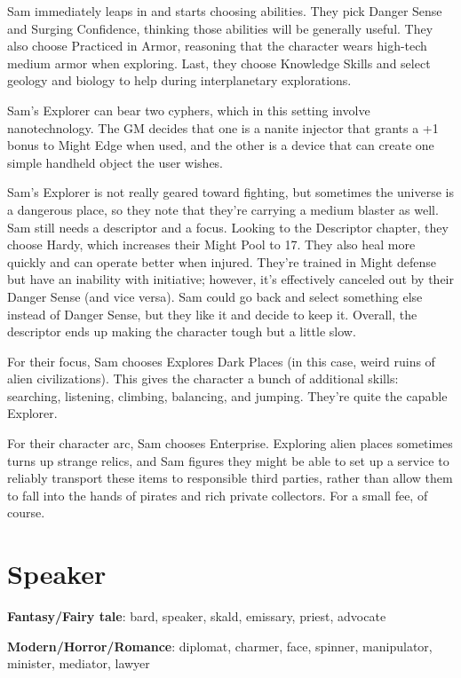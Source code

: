 \begin{multicols}{2}
Sam immediately leaps in and starts choosing abilities. They pick Danger Sense and Surging Confidence, thinking those abilities will be generally useful. They also choose Practiced in Armor, reasoning that the character wears high-tech medium armor when exploring. Last, they choose Knowledge Skills and select geology and biology to help during interplanetary explorations. 

Sam’s Explorer can bear two cyphers, which in this setting involve nanotechnology. The GM decides that one is a nanite injector that grants a +1 bonus to Might Edge when used, and the other is a device that can create one simple handheld object the user wishes. 

Sam’s Explorer is not really geared toward fighting, but sometimes the universe is a dangerous place, so they note that they’re carrying a medium blaster as well.
Sam still needs a descriptor and a focus. Looking to the Descriptor chapter, they choose Hardy, which increases their Might Pool to 17. They also heal more quickly and can operate better when injured. They’re trained in Might defense but have an inability with initiative; however, it’s effectively canceled out by their Danger Sense (and vice versa). Sam could go back and select something else instead of Danger Sense, but they like it and decide to keep it. Overall, the descriptor ends up making the character tough but a little slow.

For their focus, Sam chooses Explores Dark Places (in this case, weird ruins of alien civilizations). This gives the character a bunch of additional skills: searching, listening, climbing, balancing, and jumping. They’re quite the capable Explorer.

For their character arc, Sam chooses Enterprise. Exploring alien places sometimes turns up strange relics, and Sam figures they might be able to set up a service to reliably transport these items to responsible third parties, rather than allow them to fall into the hands of pirates and rich private collectors. For a small fee, of course.

\section{Speaker}

\textbf{Fantasy/Fairy tale}: bard, speaker, skald, emissary, priest, advocate

\textbf{Modern/Horror/Romance}: diplomat, charmer, face, spinner, manipulator, minister, mediator, lawyer


\end{multicols}
